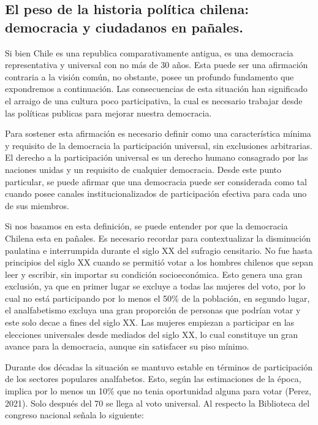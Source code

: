 \documentclass[12pt,twoside]{templates/facsothesis}
\begin{document}
\hypertarget{el-peso-de-la-historia-poluxedtica-chilena-democracia-y-ciudadanos-en-pauxf1ales.}{%
\subsection{El peso de la historia política chilena: democracia y ciudadanos en pañales.}\label{el-peso-de-la-historia-poluxedtica-chilena-democracia-y-ciudadanos-en-pauxf1ales.}}

Si bien Chile es una republica comparativamente antigua, es una democracia representativa y universal con no más de 30 años. Esta puede ser una afirmación contraria a la visión común, no obstante, posee un profundo fundamento que expondremos a continuación. Las consecuencias de esta situación han significado el arraigo de una cultura poco participativa, la cual es necesario trabajar desde las políticas publicas para mejorar nuestra democracia.

Para sostener esta afirmación es necesario definir como una característica mínima y requisito de la democracia la participación universal, sin exclusiones arbitrarias. El derecho a la participación universal es un derecho humano consagrado por las naciones unidas y un requisito de cualquier democracia. Desde este punto particular, se puede afirmar que una democracia puede ser considerada como tal cuando posee canales institucionalizados de participación efectiva para cada uno de sus miembros.

Si nos basamos en esta definición, se puede entender por que la democracia Chilena esta en pañales. Es necesario recordar para contextualizar la disminución paulatina e interrumpida durante el siglo XX del sufragio censitario. No fue hasta principios del siglo XX cuando se permitió votar a los hombres chilenos que sepan leer y escribir, sin importar su condición socioeconómica. Esto genera una gran exclusión, ya que en primer lugar se excluye a todas las mujeres del voto, por lo cual no está participando por lo menos el 50\% de la población, en segundo lugar, el analfabetismo excluya una gran proporción de personas que podrían votar y este solo decae a fines del siglo XX. Las mujeres empiezan a participar en las elecciones universales desde mediados del siglo XX, lo cual constituye un gran avance para la democracia, aunque sin satisfacer su piso mínimo.

Durante dos décadas la situación se mantuvo estable en términos de participación de los sectores populares analfabetos. Esto, según las estimaciones de la época, implica por lo menos un 10\% que no tenia oportunidad alguna para votar (Perez, 2021). Solo después del 70 se llega al voto universal. Al respecto la Biblioteca del congreso nacional señala lo siguiente:
\end{document}
